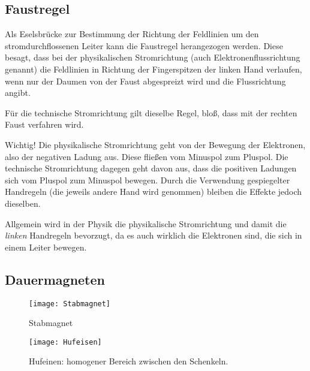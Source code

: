 \subsection{Faustregel}	\label{subsec:Faustregel}

Als Eselsbrücke zur Bestimmung der Richtung der Feldlinien um den stromdurchflossenen Leiter kann die \glqq Faustregel\grqq{} herangezogen werden. Diese besagt, dass bei der physikalischen Stromrichtung (auch Elektronenflussrichtung genannt) die Feldlinien in Richtung der Fingerspitzen der linken Hand verlaufen, wenn nur der Daumen von der Faust abgespreizt wird und die Flussrichtung angibt.

Für die technische Stromrichtung gilt dieselbe Regel, bloß, dass mit der rechten Faust verfahren wird.

\begin{leftbar}
	Wichtig! Die physikalische Stromrichtung geht von der Bewegung der Elektronen, also der negativen Ladung aus. Diese fließen vom Minuspol zum Pluspol. Die technische Stromrichtung dagegen geht davon aus, dass die positiven Ladungen sich vom Pluspol zum Minuspol bewegen. Durch die Verwendung gespiegelter Handregeln (die jeweils andere Hand wird genommen) bleiben die Effekte jedoch dieselben. 
	
	Allgemein wird in der Physik die physikalische Stromrichtung und damit die \emph{linken} Handregeln bevorzugt, da es auch wirklich die Elektronen sind, die sich in einem Leiter bewegen.
\end{leftbar}

\subsection{Dauermagneten}  	\label{subsec:DauermagnetFeld}


\begin{figure}[H]
	\centering
	\begin{minipage}[b]{0.45\linewidth}
		\centering
    	\texttt{[image: Stabmagnet]}
		\caption{Stabmagnet}
	\end{minipage}
	\quad
	\begin{minipage}[b]{0.45\linewidth}
		\centering
    	\texttt{[image: Hufeisen]}
		\caption{Hufeinen: homogener Bereich zwischen den Schenkeln.}
	\end{minipage}
\end{figure}


